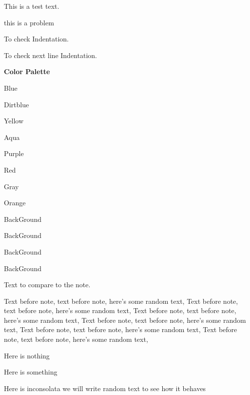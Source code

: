 \documentclass[11pt]{article}
\begin{document}
    This is a test text.


    \begin{problem*}
        this is a problem
    \end{problem*}

   To check Indentation.


   To check next line Indentation.


   \textbf{Color Palette} 

   {\color{G blue} Blue}

   {\color{G dirtblue} Dirtblue}
    
   {\color{G yellow} Yellow}

   {\color{G aqua} Aqua} 

   {\color{G purple} Purple}

   {\color{G red} Red}

   {\color{G gray} Gray}

   {\color{G orange} Orange}

   
   {\color{G bg} BackGround}

   {\color{G bg1} BackGround}

   {\color{G bg2} BackGround}

   {\color{G bg3} BackGround}
\newpage
   
Text to compare to the note.

Text before note, text before note, here's some random text, 
Text before note, text before note, here's some random text, 
Text before note, text before note, here's some random text, 
Text before note, text before note, here's some random text, 
Text before note, text before note, here's some random text, 
Text before note, text before note, here's some random text, 


\newpage
{}



\newpage
{}

{\Titillium Here is nothing}

Here is something

{\Inconsolata Here is inconsolata we will write random text to see how it behaves}
\end{document}
